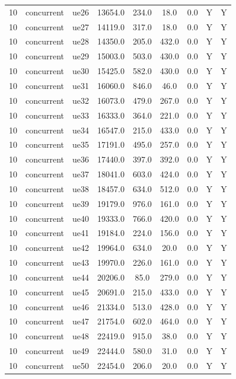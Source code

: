 \begin{table}[ht]
\begin{tabular}{|c|c|c|c|c|c|c|c|c|}
10 & concurrent & ue26 & 13654.0 & 234.0 & 18.0 & 0.0 & Y & Y \\
10 & concurrent & ue27 & 14119.0 & 317.0 & 18.0 & 0.0 & Y & Y \\
10 & concurrent & ue28 & 14350.0 & 205.0 & 432.0 & 0.0 & Y & Y \\
10 & concurrent & ue29 & 15003.0 & 503.0 & 430.0 & 0.0 & Y & Y \\
10 & concurrent & ue30 & 15425.0 & 582.0 & 430.0 & 0.0 & Y & Y \\
10 & concurrent & ue31 & 16060.0 & 846.0 & 46.0 & 0.0 & Y & Y \\
10 & concurrent & ue32 & 16073.0 & 479.0 & 267.0 & 0.0 & Y & Y \\
10 & concurrent & ue33 & 16333.0 & 364.0 & 221.0 & 0.0 & Y & Y \\
10 & concurrent & ue34 & 16547.0 & 215.0 & 433.0 & 0.0 & Y & Y \\
10 & concurrent & ue35 & 17191.0 & 495.0 & 257.0 & 0.0 & Y & Y \\
10 & concurrent & ue36 & 17440.0 & 397.0 & 392.0 & 0.0 & Y & Y \\
10 & concurrent & ue37 & 18041.0 & 603.0 & 424.0 & 0.0 & Y & Y \\
10 & concurrent & ue38 & 18457.0 & 634.0 & 512.0 & 0.0 & Y & Y \\
10 & concurrent & ue39 & 19179.0 & 976.0 & 161.0 & 0.0 & Y & Y \\
10 & concurrent & ue40 & 19333.0 & 766.0 & 420.0 & 0.0 & Y & Y \\
10 & concurrent & ue41 & 19184.0 & 224.0 & 156.0 & 0.0 & Y & Y \\
10 & concurrent & ue42 & 19964.0 & 634.0 & 20.0 & 0.0 & Y & Y \\
10 & concurrent & ue43 & 19970.0 & 226.0 & 161.0 & 0.0 & Y & Y \\
10 & concurrent & ue44 & 20206.0 & 85.0 & 279.0 & 0.0 & Y & Y \\
10 & concurrent & ue45 & 20691.0 & 215.0 & 433.0 & 0.0 & Y & Y \\
10 & concurrent & ue46 & 21334.0 & 513.0 & 428.0 & 0.0 & Y & Y \\
10 & concurrent & ue47 & 21754.0 & 602.0 & 464.0 & 0.0 & Y & Y \\
10 & concurrent & ue48 & 22419.0 & 915.0 & 38.0 & 0.0 & Y & Y \\
10 & concurrent & ue49 & 22444.0 & 580.0 & 31.0 & 0.0 & Y & Y \\
10 & concurrent & ue50 & 22454.0 & 206.0 & 20.0 & 0.0 & Y & Y \\

\end{tabular}
\end{table}
